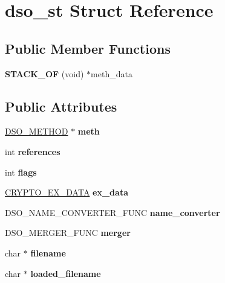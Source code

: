 \hypertarget{structdso__st}{}\section{dso\+\_\+st Struct Reference}
\label{structdso__st}
\subsection*{Public Member Functions}
\begin{DoxyCompactItemize}
\item 
\mbox{\label{structdso__st_a6391e8fe452df2d59397101c44d33bc7}} 
{\bfseries S\+T\+A\+C\+K\+\_\+\+OF} (void) $\ast$meth\+\_\+data
\end{DoxyCompactItemize}
\subsection*{Public Attributes}
\begin{DoxyCompactItemize}
\item 
\mbox{\label{structdso__st_a8a987f21e7657122da916308d8bf430f}} 
\hyperlink{structdso__meth__st}{D\+S\+O\+\_\+\+M\+E\+T\+H\+OD} $\ast$ {\bfseries meth}
\item 
\mbox{\label{structdso__st_a6db2623dcc06fe53f8ae4f0487c4fbf5}} 
int {\bfseries references}
\item 
\mbox{\label{structdso__st_a474a4c01444751dbf14d9ac94729e9b0}} 
int {\bfseries flags}
\item 
\mbox{\label{structdso__st_a77898a2a84603a2bca699d2d6dcf9b8f}} 
\hyperlink{structcrypto__ex__data__st}{C\+R\+Y\+P\+T\+O\+\_\+\+E\+X\+\_\+\+D\+A\+TA} {\bfseries ex\+\_\+data}
\item 
\mbox{\label{structdso__st_ac326d621386b5835c2686269eab8c96b}} 
D\+S\+O\+\_\+\+N\+A\+M\+E\+\_\+\+C\+O\+N\+V\+E\+R\+T\+E\+R\+\_\+\+F\+U\+NC {\bfseries name\+\_\+converter}
\item 
\mbox{\label{structdso__st_a00298e1ff0f65f22b0ec1229d7e8bac1}} 
D\+S\+O\+\_\+\+M\+E\+R\+G\+E\+R\+\_\+\+F\+U\+NC {\bfseries merger}
\item 
\mbox{\label{structdso__st_ae981476b0fae6034675c02776f7303d8}} 
char $\ast$ {\bfseries filename}
\item 
\mbox{\label{structdso__st_a96bd03d5fd52dba938c3ba0e28b74946}} 
char $\ast$ {\bfseries loaded\+\_\+filename}
\end{DoxyCompactItemize}


